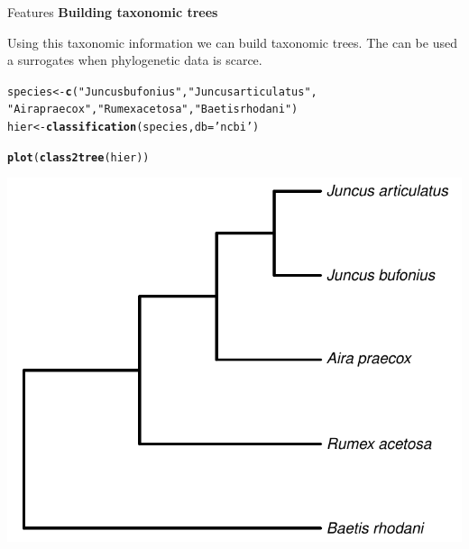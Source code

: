 \documentclass[final,t]{beamer}\usepackage[]{graphicx}\usepackage[]{color}
\makeatletter
\newcommand{\hlstr}[1]{\textcolor[rgb]{0.192,0.494,0.8}{#1}}%
\newcommand{\hlstd}[1]{\textcolor[rgb]{0.345,0.345,0.345}{#1}}%
\newcommand{\hlkwb}[1]{\textcolor[rgb]{0.69,0.353,0.396}{#1}}%
\newcommand{\hlkwc}[1]{\textcolor[rgb]{0.333,0.667,0.333}{#1}}%
\newcommand{\hlkwd}[1]{\textcolor[rgb]{0.737,0.353,0.396}{\textbf{#1}}}%
\newenvironment{kframe}{%
 \def\at@end@of@kframe{}%
 \ifinner\ifhmode%
  \def\at@end@of@kframe{\end{minipage}}%
  \begin{minipage}{\columnwidth}%
 \fi\fi%
 \def\FrameCommand##1{\hskip\@totalleftmargin \hskip-\fboxsep
 \colorbox{shadecolor}{##1}\hskip-\fboxsep
     \hskip-\linewidth \hskip-\@totalleftmargin \hskip\columnwidth}%
 \MakeFramed {\advance\hsize-\width
   \@totalleftmargin\z@ \linewidth\hsize
   \@setminipage}}%
 {\par\unskip\endMakeFramed%
 \at@end@of@kframe}
\newenvironment{knitrout}{}{} %
\renewenvironment{knitrout}{}{\vspace{-1.8em}}
\makeatother
\begin{document}
\begin{frame}[fragile]
\begin{columns}[t]
\begin{column}{.49\linewidth}
\begin{block}{Features}
\textcolor{i6bluedark}{\textbf{\large Building taxonomic trees}} 
        \vspace{0.5em}
        \par
        \begingroup
        \leftskip=2cm
        \noindent 
          Using this taxonomic information we can build taxonomic trees. 
          The can be used a surrogates when phylogenetic data is scarce.
        \par
        \endgroup
\begin{knitrout}\footnotesize
{}\color{fgcolor}\begin{kframe}
\begin{alltt}
\hlstd{species} \hlkwb{<-} \hlkwd{c}\hlstd{(}\hlstr{"Juncus bufonius"}\hlstd{,} \hlstr{"Juncus articulatus"}\hlstd{,}
    \hlstr{"Aira praecox"}\hlstd{,} \hlstr{"Rumex acetosa"}\hlstd{,} \hlstr{"Baetis rhodani"}\hlstd{)}
\hlstd{hier} \hlkwb{<-} \hlkwd{classification}\hlstd{(species,} \hlkwc{db} \hlstd{=} \hlstr{'ncbi'}\hlstd{)}
\end{alltt}
\end{kframe}
\end{knitrout}

\begin{knitrout}\footnotesize
{}\color{fgcolor}\begin{kframe}
\begin{alltt}
\hlkwd{plot}\hlstd{(}\hlkwd{class2tree}\hlstd{(hier))}
\end{alltt}
\end{kframe}
\end{knitrout}
\vspace{2em}

\begin{knitrout}\footnotesize
{}\color{fgcolor}

{\centering \includegraphics[width=0.4\linewidth]{figure/classtree} 

}




\end{knitrout}
\end{block}
\end{column}
\end{columns}
\end{frame}
\end{document}

